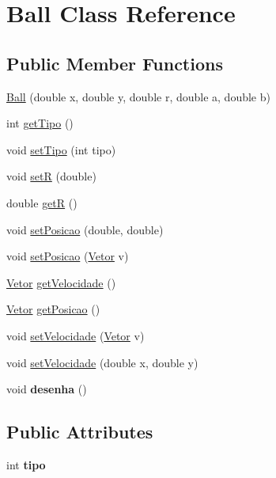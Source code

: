 \hypertarget{class_ball}{\section{\-Ball \-Class \-Reference}
\label{class_ball}
}
\subsection*{\-Public \-Member \-Functions}
\begin{DoxyCompactItemize}
\item 
\hyperlink{class_ball_a397adca6e1250bd60283f10b767519dc}{\-Ball} (double x, double y, double r, double a, double b)
\item 
int \hyperlink{class_ball_a0f4375adc33802bce14335ae51b4b590}{get\-Tipo} ()
\item 
void \hyperlink{class_ball_ad09271738076c152d096e3b01f17db38}{set\-Tipo} (int tipo)
\item 
void \hyperlink{class_ball_a1e924ceceadecb876124b9b4a6ae9234}{set\-R} (double)
\item 
double \hyperlink{class_ball_af4d11372f2bbc663a2beea5b023e28bf}{get\-R} ()
\item 
void \hyperlink{class_ball_a881c25c6aa04c635020f43283e5ecc75}{set\-Posicao} (double, double)
\item 
void \hyperlink{class_ball_ad6f2d5c2e00b3165ad872005dac55730}{set\-Posicao} (\hyperlink{class_vetor}{\-Vetor} v)
\item 
\hyperlink{class_vetor}{\-Vetor} \hyperlink{class_ball_a0b1f6d18c48702b20cd71f988408e377}{get\-Velocidade} ()
\item 
\hyperlink{class_vetor}{\-Vetor} \hyperlink{class_ball_aec6a24e92df23d237cdc11ad4619a96d}{get\-Posicao} ()
\item 
void \hyperlink{class_ball_aa9eee311951e8edc3dddf4dd0852c7ef}{set\-Velocidade} (\hyperlink{class_vetor}{\-Vetor} v)
\item 
void \hyperlink{class_ball_a8faf3c86f2c9d2d6ec2f3f36aecdc155}{set\-Velocidade} (double x, double y)
\item 
\hypertarget{class_ball_a061c257f2d562aa2a8761a919a2aa5ab}{void {\bfseries desenha} ()}\label{class_ball_a061c257f2d562aa2a8761a919a2aa5ab}

\end{DoxyCompactItemize}
\subsection*{\-Public \-Attributes}
\begin{DoxyCompactItemize}
\item 
\hypertarget{class_ball_ab0b984ed19efa6999e6d4064cfa26f9c}{int {\bfseries tipo}}\label{class_ball_ab0b984ed19efa6999e6d4064cfa26f9c}

\end{DoxyCompactItemize}


